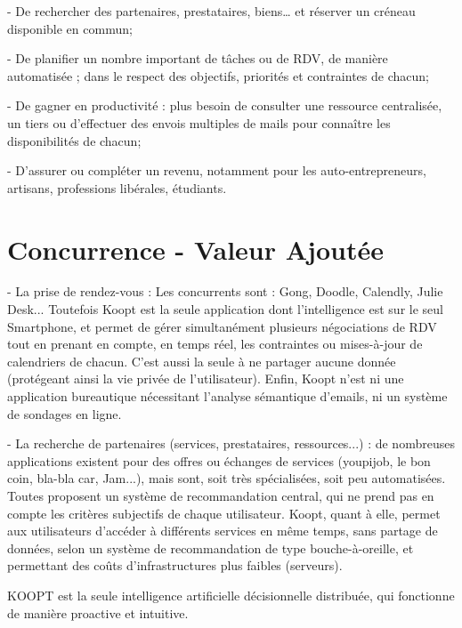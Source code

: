 - De rechercher des partenaires, prestataires, biens… et réserver un créneau disponible en commun; 

- De planifier un nombre important de tâches ou de RDV, de manière automatisée ; dans le respect des objectifs, priorités et contraintes de chacun;  

- De gagner en productivité : plus besoin de consulter une ressource centralisée, un tiers ou d'effectuer des envois multiples de mails pour connaître les disponibilités de chacun; 

- D’assurer ou compléter un revenu, notamment pour les auto-entrepreneurs, artisans, professions libérales, étudiants.

\section{Concurrence - Valeur Ajoutée}

 - La prise de rendez-vous : Les concurrents sont : Gong, Doodle, Calendly, Julie Desk... Toutefois Koopt est la seule application dont l’intelligence est sur le seul Smartphone, et permet de gérer simultanément plusieurs négociations de RDV tout en prenant en compte, en temps réel, les contraintes ou mises-à-jour de calendriers de chacun. C’est aussi la seule à ne partager aucune donnée (protégeant ainsi la vie privée de l’utilisateur). Enfin, Koopt n’est ni une application bureautique nécessitant l’analyse sémantique d’emails, ni un système de sondages en ligne.
 
 - La recherche de partenaires (services, prestataires, ressources...) : de nombreuses applications existent pour des offres ou échanges de services (youpijob, le bon coin, bla-bla car, Jam...), mais sont, soit très spécialisées, soit peu automatisées. Toutes proposent un système de recommandation central, qui ne prend pas en compte les critères subjectifs de chaque utilisateur. Koopt, quant à elle, permet aux utilisateurs d’accéder à différents services en même temps, sans partage de données, selon un système de recommandation de type bouche-à-oreille, et permettant des coûts d’infrastructures plus faibles (serveurs).					
 
KOOPT est la seule intelligence artificielle décisionnelle distribuée, qui fonctionne de manière proactive et intuitive. 



